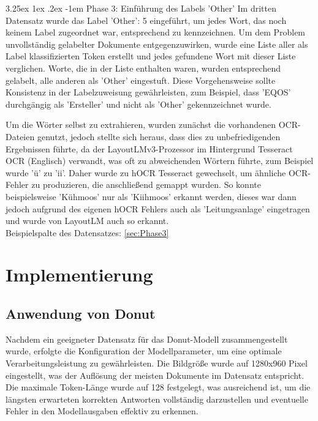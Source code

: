 \documentclass[12pt,a4paper,twoside]{article}
\makeatletter
\renewcommand\paragraph{\@startsection{paragraph}{5}{\z@}%
  {3.25ex \@plus1ex \@minus.2ex}%
  {-1em}%
  {\normalfont\normalsize\bfseries}}
\makeatother
\begin{document}
\paragraph{Phase 3: Einführung des Labels 'Other'}
Im dritten Datensatz wurde das Label 'Other': 5 eingeführt, um jedes Wort, das noch keinem Label zugeordnet war, entsprechend zu kennzeichnen. Um dem Problem unvollständig gelabelter Dokumente entgegenzuwirken, wurde eine Liste aller als Label klassifizierten Token erstellt und jedes gefundene Wort mit dieser Liste verglichen. Worte, die in der Liste enthalten waren, wurden entsprechend gelabelt, alle anderen als 'Other' eingestuft. Diese Vorgehensweise sollte Konsistenz in der Labelzuweisung gewährleisten, zum Beispiel, dass 'EQOS' durchgängig als 'Ersteller' und nicht als 'Other' gekennzeichnet wurde.

Um die Wörter selbst zu extrahieren, wurden zunächst die vorhandenen OCR-Dateien genutzt, jedoch stellte sich heraus, dass dies zu unbefriedigenden Ergebnissen führte, da der LayoutLMv3-Prozessor im Hintergrund Tesseract OCR (Englisch) verwandt, was oft zu abweichenden Wörtern führte, zum Beispiel wurde 'ü' zu 'ii'. Daher wurde zu hOCR Tesseract gewechselt, um ähnliche OCR-Fehler zu produzieren, die anschließend gemappt wurden. So konnte beispielsweise 'Kühmoos' nur als 'Kiihmoos' erkannt werden, dieses war dann jedoch aufgrund des eigenen hOCR Fehlers auch als 'Leitungsanlage' eingetragen und wurde von LayoutLM auch so erkannt.\\
Beispielspalte des Datensatzes:
\ref{sec:Phase3}

\section{Implementierung}
\subsection{Anwendung von Donut}
Nachdem ein geeigneter Datensatz für das Donut-Modell zusammengestellt wurde, erfolgte die Konfiguration der Modellparameter, um eine optimale Verarbeitungsleistung zu gewährleisten. Die Bildgröße wurde auf 1280x960 Pixel eingestellt, was der Auflösung der meisten Dokumente im Datensatz entspricht. Die maximale Token-Länge wurde auf 128 festgelegt, was ausreichend ist, um die längsten erwarteten korrekten Antworten vollständig darzustellen und eventuelle Fehler in den Modellausgaben effektiv zu erkennen.
\end{document}
